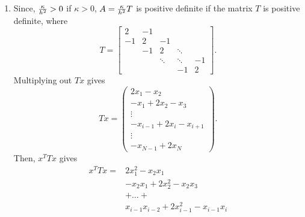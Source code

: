 {\begin{solution}
\begin{enumerate}
\begin{itemize}
\item To show that $(Av_j)_N = (\lambda_j v_j)_N$, we consider
\[ (Av_j)_N =  \sin\Big({(N-1)j\pi\over N+1}\Big), \qquad
   (\lambda_j v_j)_N =  2@@\cos\Big({j \pi \over N+1}\Big)\sin\Big({Nj\pi\over N+1}\Big).\]
As we use the identity $2 \cos(\phi)\sin(\theta) = \sin(\theta+\phi)+\sin(\theta-\phi)$. 
With $\phi = j\pi/(N+1)$ and $\theta = Nj \pi/(N+1)$, we have
\begin{eqnarray*}
  (\lambda_j v_j)_N &=& 2\cos\Big({j\pi\over N+1}\Big) \sin\Big({jk\pi\over N+1}\Big) \\[.5em]
     &=& \sin\Big({(N+1)j \pi \over N+1} \Big)+\sin\Big({N-1)j\pi \over N+1}\Big) \\[.5em]
     &=& \sin\Big(j \pi\Big)+\sin\Big({N-1)j\pi \over N+1}\Big) \\[.5em]
     &=& \sin\Big({N-1)j\pi \over N+1}\Big),
\end{eqnarray*}
where the last step used the fact that $j$ is an integer.  Notice that this last quantity is
precisely $(Av_j)_N$, so we have shown that $(Av_j)_N = (\lambda_j v_j)_N$.  
\end{itemize}
\item Since, ${\kappa\over h^2} > 0$ if $\kappa > 0$, $A = {\kappa\over h^2}T$ is positive definite if the matrix $T$ is positive definite, where 
\[
T = \left[\begin{array}{rrrrr}
              2 & -1 \\[0.25em]
               -1 & 2 & -1 \\
                 &  -1  & 2 & \ddots \\
                 & & \ddots & \ddots & -1 \\[0.25em]
                 & & & -1 & 2 
               \end{array}\right].
\]
Multiplying out $Tx$ gives
\[
Tx = \left(
\begin{array}{c}
2x_1 - x_2\\
-x_1 + 2x_2 - x_3\\
\vdots\\
-x_{i-1} + 2x_i - x_{i+1}\\
\vdots\\
-x_{N-1}  + 2x_N
\end{array}
\right).
\]
Then, $x^T T x$ gives
\begin{align*}
x^T Tx =& 2x_1^2 - x_2x_1\\
& - x_2x_1 + 2x_2^2 - x_2 x_3 \\
& + \ldots + \\
& x_{i-1}x_{i-2} + 2x_{i-1}^2 - x_{i-1}x_i\\

\end{align*}
\end{enumerate}
\end{solution}}
